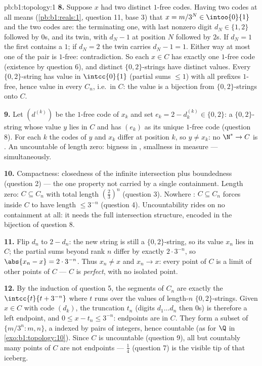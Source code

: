 \begin{solution}{pb:b1:topology:1}
\textbf{8.} Suppose $x$ had two distinct $1$-free codes. Having
two codes at all means (\cref{pb:b1:reals:1}, question 11, base
$3$) that $x = m/3^N \in \intoo{0}{1}$ and the two codes are:
the terminating one, with last nonzero digit $d_N \in \{1, 2\}$
followed by $0$s, and its twin, with $d_N - 1$ at position $N$
followed by $2$s. If $d_N = 1$ the first contains a $1$; if $d_N
= 2$ the twin carries $d_N - 1 = 1$. Either way at most one of
the pair is $1$-free: contradiction. So each $x \in C$ has
exactly one $1$-free code (existence by question 6), and
distinct $\{0,2\}$-strings have distinct values. Every
$\{0,2\}$-string has value in $\intcc{0}{1}$ (partial sums $\leq
1$) with all prefixes $1$-free, hence value in every $C_n$,
i.e.\ in $C$: the value  is a bijection from
$\{0,2\}$-strings onto $C$.

\textbf{9.} Let $(d^{(k)})$ be the $1$-free code of $x_k$ and
set $e_k = 2 - d^{(k)}_k \in \{0, 2\}$: a $\{0,2\}$-string whose
value $y$ lies in $C$ and has $(e_k)$ as its unique $1$-free
code (question 8). For each $k$ the codes of $y$ and $x_k$
differ at position $k$, so $y \neq x_k$: no  $\N^* \to C$ is
. An uncountable  of length zero: bigness in
, smallness in measure --- simultaneously.

\textbf{10.} Compactness: closedness of the infinite
intersection plus boundedness (question 2) --- the one property
not carried by a single containment. Length zero: $C \subseteq
C_n$ with total length $(\frac23)^n$ (question 3). Nowhere
: $C \subseteq C_n$ forces  inside $C$ to have
length $\leq 3^{-n}$ (question 4). Uncountability rides on no
containment at all: it needs the full intersection structure,
encoded in the bijection of question 8.

\textbf{11.} Flip $d_n$ to $2 - d_n$: the new string is still a
$\{0,2\}$-string, so its value $x_n$ lies in $C$; the partial
sums beyond rank $n$ differ by exactly $2\cdot3^{-n}$, so
$\abs{x_n - x} = 2\cdot3^{-n}$. Thus $x_n \neq x$ and $x_n \to
x$: every point of $C$ is a limit of other points of $C$ --- $C$
is \emph{perfect}, with no isolated point.

\textbf{12.} By the induction of question 5, the segments of
$C_n$ are exactly the $\intcc{t}{t + 3^{-n}}$ where $t$ runs
over the values of length-$n$ $\{0,2\}$-strings. Given $x \in C$
with code $(d_k)$, the truncation $t_n$ (digits $d_1 \dots d_n$
then $0$s) is therefore a left endpoint, and $0 \leq x - t_n
\leq 3^{-n}$: endpoints are  in $C$. They form a subset of
$\{m/3^n : m, n\}$, a  indexed by pairs of integers, hence
countable (as for $\Q$ in \cref{exo:b1:topology:10}). Since $C$
is uncountable (question 9), all but countably many points of
$C$ are not endpoints --- $\frac14$ (question 7) is the visible
tip of that iceberg.


\end{solution}
